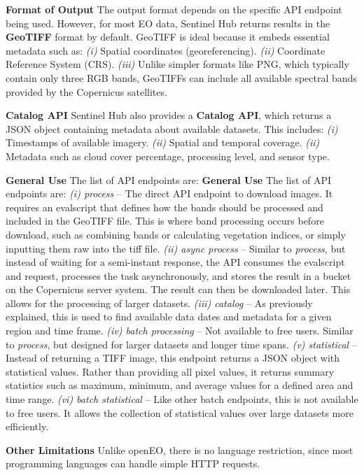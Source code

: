 \textbf{Format of Output}
The output format depends on the specific API endpoint being used. However, for most EO data, Sentinel Hub returns results in the \textbf{GeoTIFF} format by default. GeoTIFF is ideal because it embeds essential metadata such as:
\textit{(i)} Spatial coordinates (georeferencing).
\textit{(ii)} Coordinate Reference System (CRS).
\textit{(iii)} Unlike simpler formats like PNG, which typically contain only three RGB bands, GeoTIFFs can include all available spectral bands provided by the Copernicus satellites.

\textbf{Catalog API}  
Sentinel Hub also provides a \textbf{Catalog API}, which returns a JSON object containing metadata about available datasets. This includes:
\textit{(i)} Timestamps of available imagery.
\textit{(ii)} Spatial and temporal coverage.
\textit{(ii)} Metadata such as cloud cover percentage, processing level, and sensor type.


\textbf{General Use}
The list of API endpoints are: 
\textbf{General Use}  
The list of API endpoints are:  
\textit{(i) process} – The direct API endpoint to download images. It requires an evalscript that defines how the bands should be processed and included in the GeoTIFF file. This is where band processing occurs before download, such as combining bands or calculating vegetation indices, or simply inputting them raw into the tiff file.
\textit{(ii) async process} – Similar to \textit{process}, but instead of waiting for a semi-instant response, the API consumes the evalscript and request, processes the task asynchronously, and stores the result in a bucket on the Copernicus server system. The result can then be downloaded later. This allows for the processing of larger datasets.  
\textit{(iii) catalog} – As previously explained, this is used to find available data dates and metadata for a given region and time frame.  
\textit{(iv) batch processing} – Not available to free users. Similar to \textit{process}, but designed for larger datasets and longer time spans.  
\textit{(v) statistical} – Instead of returning a TIFF image, this endpoint returns a JSON object with statistical values. Rather than providing all pixel values, it returns summary statistics such as maximum, minimum, and average values for a defined area and time range.  
\textit{(vi) batch statistical} – Like other batch endpoints, this is not available to free users. It allows the collection of statistical values over large datasets more efficiently.


\textbf{Other Limitations}  
Unlike openEO, there is no language restriction, since most programming languages can handle simple HTTP requests.


